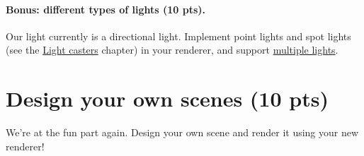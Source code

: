 \paragraph{Bonus: different types of lights (10 pts).} Our light currently is a directional light. Implement point lights and spot lights (see the \href{https://learnopengl.com/Lighting/Light-casters}{Light casters} chapter) in your renderer, and support \href{https://learnopengl.com/Lighting/Multiple-lights}{multiple lights}.

\section{Design your own scenes (10 pts)}
We're at the fun part again. Design your own scene and render it using your new renderer!

%
%


